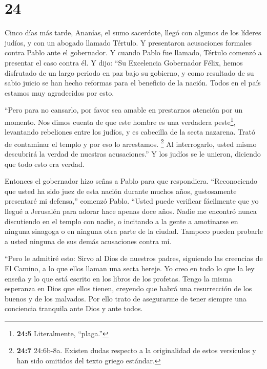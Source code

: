 \hypertarget{section-23}{%
\section{24}\label{section-23}}

 Cinco días más tarde, Ananías, el sumo sacerdote, llegó con
algunos de los líderes judíos, y con un abogado llamado Tértulo. Y
presentaron acusaciones formales contra Pablo ante el gobernador.
 Y cuando Pablo fue llamado, Tértulo comenzó a presentar el
caso contra él. Y dijo: ``Su Excelencia Gobernador Félix, hemos
disfrutado de un largo periodo en paz bajo su gobierno, y como resultado
de su sabio juicio se han hecho reformas para el beneficio de la nación.
 Todos en el país estamos muy agradecidos por esto.

 ``Pero para no cansarlo, por favor sea amable en prestarnos
atención por un momento.  Nos dimos cuenta de que este
hombre es una verdadera peste\footnote{\textbf{24:5} Literalmente,
  ``plaga.''}, levantando rebeliones entre los judíos, y es cabecilla de
la secta nazarena.  Trató de contaminar el templo y por eso
lo arrestamos.  \footnote{\textbf{24:7} 24:6b-8a. Existen
  dudas respecto a la originalidad de estos versículos y han sido
  omitidos del texto griego estándar.}  Al interrogarlo,
usted mismo descubrirá la verdad de nuestras acusaciones.'' 
Y los judíos se le unieron, diciendo que todo esto era verdad.

 Entonces el gobernador hizo señas a Pablo para que
respondiera. ``Reconociendo que usted ha sido juez de esta nación
durante muchos años, gustosamente presentaré mi defensa,'' comenzó
Pablo.  ``Usted puede verificar fácilmente que yo llegué a
Jerusalén para adorar hace apenas doce años.  Nadie me
encontró nunca discutiendo en el templo con nadie, o incitando a la
gente a amotinarse en ninguna sinagoga o en ninguna otra parte de la
ciudad.  Tampoco pueden probarle a usted ninguna de sus
demás acusaciones contra mí.

 ``Pero le admitiré esto: Sirvo al Dios de nuestros padres,
siguiendo las creencias de El Camino, a lo que ellos llaman una secta
hereje. Yo creo en todo lo que la ley enseña y lo que está escrito en
los libros de los profetas.  Tengo la misma esperanza en
Dios que ellos tienen, creyendo que habrá una resurrección de los buenos
y de los malvados.  Por ello trato de asegurarme de tener
siempre una conciencia tranquila ante Dios y ante todos.

